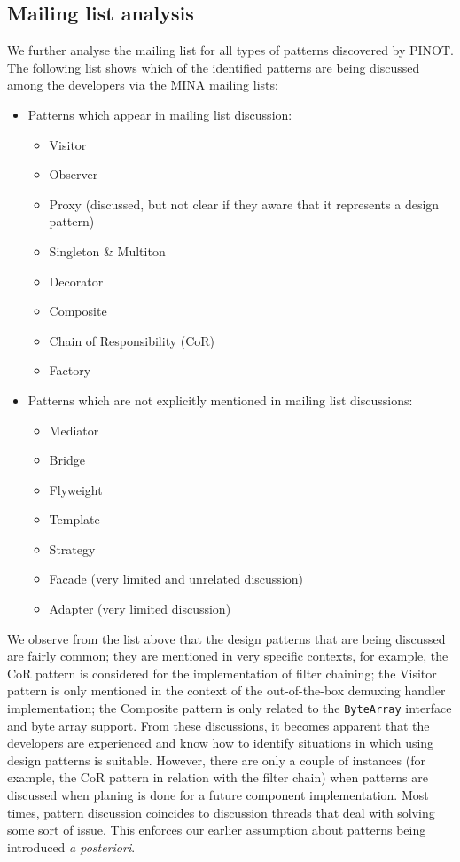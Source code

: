 \begin{itemize}
\end{itemize}

\subsection{Mailing list analysis}
\label{sec:malilinglist_analysis}
We further analyse the mailing list for all types of patterns discovered by PINOT. The following list shows which of the identified patterns are being discussed among the developers via the MINA mailing lists:
\begin{itemize}
    \item Patterns which appear in mailing list discussion: 
        \begin{itemize}
            \item Visitor
            \item Observer
            \item Proxy (discussed, but not clear if they aware that it represents a design pattern)
            \item Singleton \& Multiton
            \item Decorator
            \item Composite
            \item Chain of Responsibility (CoR)
            \item Factory
        \end{itemize}
    \item Patterns which are not explicitly mentioned in mailing list discussions:
        \begin{itemize}
            \item Mediator
            \item Bridge
            \item Flyweight
            \item Template
            \item Strategy
            \item Facade (very limited and unrelated discussion)
            \item Adapter (very limited discussion)
        \end{itemize}
\end{itemize}
We observe from the list above that the design patterns that are being discussed are fairly common; they are mentioned in very specific contexts, for example, the CoR pattern is considered for the implementation of filter chaining; the Visitor pattern is only mentioned in the context of the out-of-the-box demuxing handler implementation; the Composite pattern is only related to the \texttt{ByteArray} interface and byte array support. From these discussions, it becomes apparent that the developers are experienced and know how to identify situations in which using design patterns is suitable. However, there are only a couple of instances (for example, the CoR pattern in relation with the filter chain) when patterns are discussed when planing is done for a future component implementation. Most times, pattern discussion coincides to discussion threads that deal with solving some sort of issue. This enforces our earlier assumption about patterns being introduced \textit{a posteriori}.\\\\
